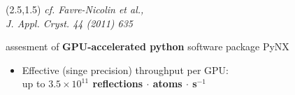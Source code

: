 \documentclass[]{beamer}
\begin{document}
\begin{frame}
\begin{columns}
\begin{column}{0.5\textwidth}
        \end{column}
    \end{columns}
    \begin{textblock}{5}(2.5,1.5)
       \scriptsize\itshape{cf. Favre-Nicolin et al.,\\ J. Appl. Cryst. 44 (2011) 635}
    \end{textblock}
    \begin{block}{assesment of \textbf{GPU-accelerated python} software package PyNX}
        \begin{itemize}
            \item \small Effective (singe precision) throughput per GPU: \\ 
             up to \textbf{$3.5\times 10^{11}$ reflections $\cdot$ atoms $\cdot$ s$^{-1}$}  
        \end{itemize}
    \end{block}
\end{frame}

\end{document}
